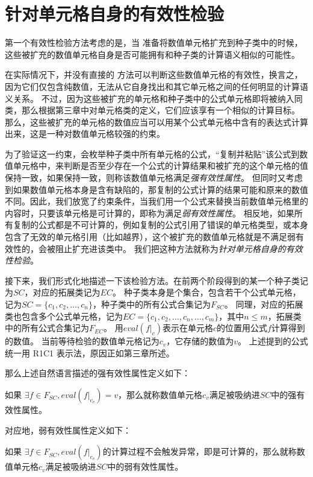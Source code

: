 

\section{针对单元格自身的有效性检验}

第一个有效性检验方法考虑的是，当 \wa 准备将数值单元格扩充到种子类中的时候，这些被扩充的数值单元格自身是否可能拥有和种子类的计算语义相似的可能性。

在实际情况下，并没有直接的 方法可以判断这些数值单元格的有效性，换言之，因为它们仅包含纯数值，无法从它自身找出和其它单元格之间的任何明显的计算语义关系。
不过，因为这些被扩充的单元格和种子类中的公式单元格即将被纳入同类，那么根据第三章中对单元格类的定义，它们应该享有一个相似的计算目标。
那么，这些被扩充的单元格的数值应当可以用某个公式单元格中含有的表达式计算出来，这是一种对数值单元格较强的约束。

为了验证这一约束，\wa 会枚举种子类中所有单元格的公式，“复制并粘贴”该公式到数值单元格中，来判断是否至少存在一个公式的计算结果和被扩充的这个单元格的值保持一致，如果保持一致，则称该数值单元格满足\textit{强有效性属性}。
但同时又考虑到如果数值单元格本身是含有缺陷的，那复制的公式计算的结果可能和原来的数值不同。因此，我们放宽了约束条件，当我们用一个公式来替换当前数值单元格里的内容时，只要该单元格是可计算的，即称为满足\textit{弱有效性属性}。
相反地，如果所有复制的公式都是不可计算的，例如复制的公式引用了错误的单元格类型，或本身包含了无效的单元格引用（比如越界），这个被扩充的数值单元格就是不满足弱有效性的，会被阻止扩充进该类中。
我们把这种方法就称为\textit{针对单元格自身的有效性检验}。

接下来，我们形式化地描述一下该检验方法。在前两个阶段得到的某一个种子类记为$SC$，对应的拓展类记为$EC$。
种子类本身是个集合，包含若干个公式单元格，记为$SC= \{c_{1}, c_{2}, \dots, c_{n}\}$，种子类中的所有公式合集记为$F_{SC}$。
同理，对应的拓展类也包含多个公式单元格，记为$EC=\{c_1, c_2, \dots, c_n, \dots, c_m\}$，其中$n \leq m$，拓展类中的所有公式合集记为$F_{EC}$。
用$eval(f|_c)$表示在单元格$c$的位置用公式$f$计算得到的数值。
当前等待检验的数值单元格记为$c_v$，它存储的数值为$v$。
上述提到的公式统一用 R1C1 表示法，原因正如第三章所述。

那么上述自然语言描述的强有效性属性定义如下：
\begin{definition}
    如果 $\exists f \in F_{SC},  eval(f|_{c_v}) = v$，那么就称数值单元格$c_v$满足被吸纳进$SC$中的强有效性属性。   
\end{definition}

对应地，弱有效性属性定义如下：
\begin{definition}
    如果 $\exists f \in F_{SC}, eval(f|_{c_v})$的计算过程不会触发异常，即是可计算的，那么就称数值单元格$c_v$满足被吸纳进$SC$中的弱有效性属性。
\end{definition}

